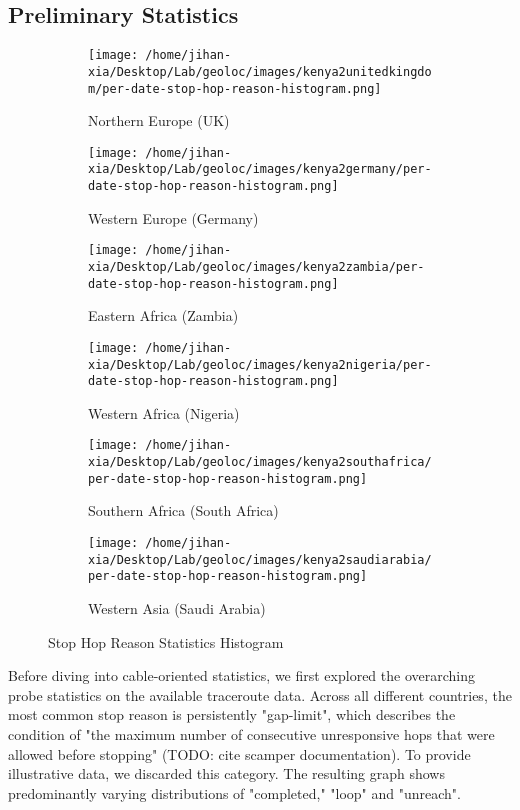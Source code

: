 \documentclass[twocolumn]{article}
\begin{document}
\subsection{Preliminary Statistics}
\begin{figure}[!htbp]
  \centering
  \begin{subfigure}{0.24\textwidth}
    \centering
    \texttt{[image: /home/jihan-xia/Desktop/Lab/geoloc/images/kenya2unitedkingdom/per-date-stop-hop-reason-histogram.png]}
    \caption{Northern Europe (UK)}
  \end{subfigure}
  \begin{subfigure}{0.24\textwidth}
    \centering
    \texttt{[image: /home/jihan-xia/Desktop/Lab/geoloc/images/kenya2germany/per-date-stop-hop-reason-histogram.png]}
    \caption{Western Europe (Germany)}
  \end{subfigure}
  \begin{subfigure}{0.24\textwidth}
    \centering
    \texttt{[image: /home/jihan-xia/Desktop/Lab/geoloc/images/kenya2zambia/per-date-stop-hop-reason-histogram.png]}
    \caption{Eastern Africa (Zambia)}
  \end{subfigure}
  \begin{subfigure}{0.24\textwidth}
    \centering
    \texttt{[image: /home/jihan-xia/Desktop/Lab/geoloc/images/kenya2nigeria/per-date-stop-hop-reason-histogram.png]}
    \caption{Western Africa (Nigeria)}
  \end{subfigure}
  \begin{subfigure}{0.24\textwidth}
    \centering
    \texttt{[image: /home/jihan-xia/Desktop/Lab/geoloc/images/kenya2southafrica/per-date-stop-hop-reason-histogram.png]}
    \caption{Southern Africa (South Africa)}
  \end{subfigure}
  \begin{subfigure}{0.24\textwidth}
    \centering
    \texttt{[image: /home/jihan-xia/Desktop/Lab/geoloc/images/kenya2saudiarabia/per-date-stop-hop-reason-histogram.png]}
    \caption{Western Asia (Saudi Arabia)}
  \end{subfigure}
  \caption{Stop Hop Reason Statistics Histogram}
  \label{fig:stopreasons}
\end{figure}
Before diving into cable-oriented statistics, we first explored the overarching probe statistics on the available traceroute data. Across all different countries, the most common stop reason is persistently "gap-limit", which describes the condition of "the maximum number of consecutive unresponsive hops that were allowed before stopping" (TODO: cite scamper documentation). To provide illustrative data, we discarded this category. The resulting graph shows predominantly varying distributions of "completed," "loop" and "unreach". 
\end{document}
